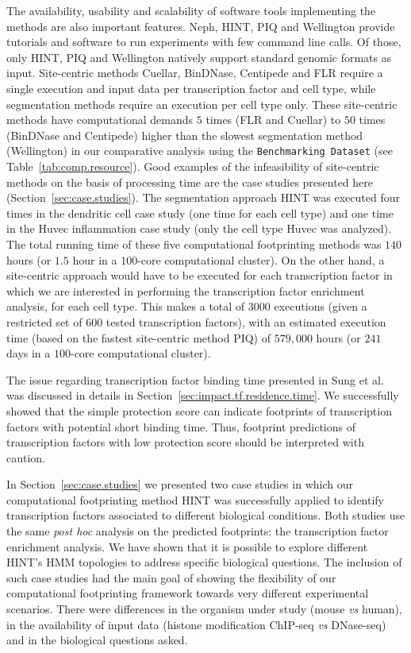 The availability, usability and scalability of software tools implementing the methods are also important features. Neph, HINT, PIQ and Wellington provide tutorials and software to run experiments with few command line calls. Of those, only HINT, PIQ and Wellington natively support standard genomic formats as input. Site-centric methods Cuellar, BinDNase, Centipede and FLR require a single execution and input data per transcription factor and cell type, while segmentation methods require an execution per cell type only. These site-centric methods have computational demands $5$ times (FLR and Cuellar) to $50$ times (BinDNase and Centipede) higher than the slowest segmentation method (Wellington) in our comparative analysis using the {\tt Benchmarking Dataset} (see Table~\ref{tab:comp.resource}). Good examples of the infeasibility of site-centric methods on the basis of processing time are the case studies presented here (Section~\ref{sec:case.studies}). The segmentation approach HINT was executed four times in the dendritic cell case study (one time for each cell type) and one time in the Huvec inflammation case study (only the cell type Huvec was analyzed). The total running time of these five computational footprinting methods was \approxy$140$ hours (or \approxy$1.5$ hour in a $100$-core computational cluster). On the other hand, a site-centric approach would have to be executed for each transcription factor in which we are interested in performing the transcription factor enrichment analysis, for each cell type. This makes a total of \approxy$3000$ executions (given a restricted set of $600$ tested transcription factors), with an estimated execution time (based on the fastest site-centric method PIQ) of $579,000$ hours (or $241$ days in a $100$-core computational cluster).

The issue regarding transcription factor binding time presented in Sung et al.~\cite{sung2014} was discussed in details in Section~\ref{sec:impact.tf.residence.time}. We successfully showed that the simple protection score can indicate footprints of transcription factors with potential short binding time. Thus, footprint predictions of transcription factors with low protection score should be interpreted with caution.

In Section~\ref{sec:case.studies} we presented two case studies in which our computational footprinting method HINT was successfully applied to identify transcription factors associated to different biological conditions. Both studies use the same \emph{post hoc} analysis on the predicted footprints: the transcription factor enrichment analysis. We have shown that it is possible to explore different HINT's HMM topologies to address specific biological questions. The inclusion of such case studies had the main goal of showing the flexibility of our computational footprinting framework towards very different experimental scenarios. There were differences in the organism under study (mouse \emph{vs} human), in the availability of input data (histone modification ChIP-seq \emph{vs} DNase-seq) and in the biological questions asked.


